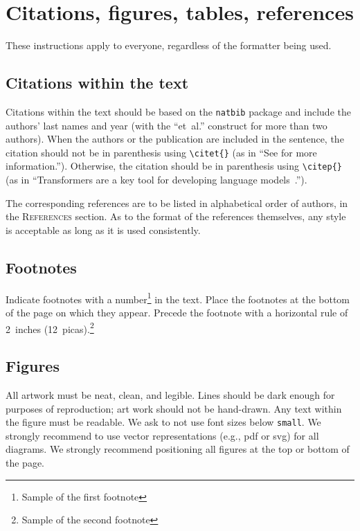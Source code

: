 \documentclass{article} %
\begin{document}
\section{Citations, figures, tables, references}\label{others}

These instructions apply to everyone, regardless of the formatter being used.

\subsection{Citations within the text}

Citations within the text should be based on the \texttt{natbib} package
and include the authors' last names and year (with the ``et~al.'' construct
for more than two authors). When the authors or the publication are
included in the sentence, the citation should not be in parenthesis using \verb|\citet{}| (as
in ``See \citet{Vaswani+2017} for more information.''). Otherwise, the citation
should be in parenthesis using \verb|\citep{}| (as in ``Transformers are a key tool
for developing language models~\citep{Vaswani+2017}.'').

The corresponding references are to be listed in alphabetical order of
authors, in the \textsc{References} section. As to the format of the
references themselves, any style is acceptable as long as it is used
consistently.

\subsection{Footnotes}

Indicate footnotes with a number\footnote{Sample of the first footnote} in the
text. Place the footnotes at the bottom of the page on which they appear.
Precede the footnote with a horizontal rule of 2~inches
(12~picas).\footnote{Sample of the second footnote}

\subsection{Figures}

All artwork must be neat, clean, and legible. Lines should be dark
enough for purposes of reproduction; art work should not be
hand-drawn. Any text within the figure must be readable. We ask to not use font sizes below {\tt small}. We strongly recommend to use vector representations (e.g., pdf or svg) for all diagrams. 
We strongly recommend positioning all figures at the top or bottom of the page.
\end{document}
